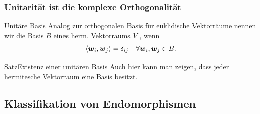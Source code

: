 \subsubsection{Unitarität ist die komplexe Orthogonalität}
\begin{Def}
{Unitäre Basis}
Analog zur orthogonalen Basis für euklidische Vektorräume nennen wir die Basis $B$ eines herm. Vektorraums $V$ , wenn
\begin{equation}
\left\langle{{\text{\boldmath${w}$}}}_i,{{\text{\boldmath${w}$}}}_j\right\rangle=\delta_{ij}\quad\forall {{\text{\boldmath${w}$}}}_i, {{\text{\boldmath${w}$}}}_j\in B.
\end{equation}
\end{Def}
\begin{Satz}
{Satz}{Existenz einer unitären Basis}
Auch hier kann man zeigen, dass jeder hermitesche Vektorraum eine Basis besitzt.
\end{Satz}

\subsection{Klassifikation von Endomorphismen}

